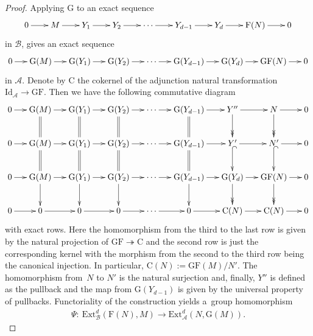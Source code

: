 \documentclass[11pt]{article}
\begin{document}
\begin{proof}
Applying $\mathrm{G}$ to an exact sequence
\begin{gather*}
\xymatrix@C=7mm{
0\ar[r]&M\ar[r]&Y_1\ar[r]&Y_2\ar[r]&\cdots\ar[r]&Y_{d-1}\ar[r]&Y_d\ar[r]&\mathrm{F}(N)\ar[r]&0
}
\end{gather*}
in $\mathcal{B}$, gives an exact sequence
\begin{gather*}
\xymatrix@C=5mm{
0\ar[r]&\mathrm{G}(M)\ar[r]&\mathrm{G}(Y_1)\ar[r]&\mathrm{G}(Y_2)\ar[r]&
\cdots\ar[r]&\mathrm{G}(Y_{d-1})\ar[r]&\mathrm{G}(Y_d)\ar[r]&\mathrm{G}\mathrm{F}(N)\ar[r]&0
}
\end{gather*}
in $\mathcal{A}$.
Denote by $\mathrm{C}$ the cokernel of the adjunction natural transformation $\mathrm{Id}_{\mathcal{A}}\to
\mathrm{G}\mathrm{F}$.
Then we have the following commutative diagram
\begin{gather*}%
\xymatrix@C=5mm{
0\ar[r]&\mathrm{G}(M)\ar[r]\ar@{=}[d]&\mathrm{G}(Y_1)\ar[r]\ar@{=}[d]&\mathrm{G}(Y_2)\ar[r]\ar@{=}[d]&
\cdots\ar[r]&\mathrm{G}(Y_{d-1})\ar[r]\ar@{=}[d]&
Y''\ar[r]\ar@{->>}[d]&N\ar[r]\ar@{->>}[d]&0\\
0\ar[r]&\mathrm{G}(M)\ar[r]\ar@{=}[d]&\mathrm{G}(Y_1)\ar[r]\ar@{=}[d]&\mathrm{G}(Y_2)\ar[r]\ar@{=}[d]&
\cdots\ar[r]&\mathrm{G}(Y_{d-1})\ar[r]\ar@{=}[d]&
Y'\ar[r]\ar@{^{(}->}[d]&N'\ar[r]\ar@{^{(}->}[d]&0\\
0\ar[r]&\mathrm{G}(M)\ar[r]\ar[d]&\mathrm{G}(Y_1)\ar[r]\ar[d]&\mathrm{G}(Y_2)\ar[r]\ar[d]&
\cdots\ar[r]&\mathrm{G}(Y_{d-1})\ar[r]\ar[d]&
\mathrm{G}(Y_d)\ar[r]\ar@{->>}[d]&\mathrm{G}\mathrm{F}(N)\ar[r]\ar@{->>}[d]&0\\
0\ar[r]&0\ar[r]&0\ar[r]&0\ar[r]&
\cdots\ar[r]&0\ar[r]&\mathrm{C}(N)\ar[r]&\mathrm{C}(N)\ar[r]&0
}
\end{gather*}
with exact rows.
Here the homomorphism from the third to the last row is given by the natural projection of
$\mathrm{G}\mathrm{F}\twoheadrightarrow \mathrm{C}$ and the second row is just the corresponding kernel with the
morphism from the second to the third row being the canonical injection.
In particular, $\mathrm{C}(N):=\mathrm{G}\mathrm{F}(M)/N'$.
The homomorphism from~$N$ to $N'$ is the natural surjection and, f\/inally, $Y''$ is def\/ined as the pullback and the map
from $\mathrm{G}(Y_{d-1})$ is given by the universal property of pullbacks.
Functoriality of the construction yields a~group homomorphism
\begin{gather*}
\Psi: \ \mathrm{Ext}^d_{\mathcal{B}}(\mathrm{F}(N),M)\to \mathrm{Ext}^d_{\mathcal{A}}(N,\mathrm{G}(M)).
\end{gather*}


\end{proof}
\end{document}
